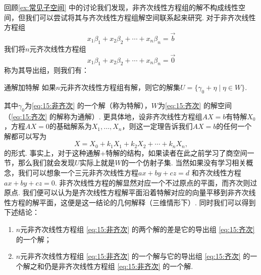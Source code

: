 回顾\autoref{ex:常见子空间} 中的讨论我们发现，非齐次线性方程组的解不构成线性空间，但我们可以尝试将其与齐次线性方程组解空间联系起来研究. 对于非齐次线性方程组
\begin{equation} \label{eq:15:非齐次}
    x_1\beta_1+x_2\beta_2+\cdots+x_n\beta_n=\vec{b}
\end{equation}
我们将$n$元齐次线性方程组
\begin{equation} \label{eq:15:齐次}
    x_1\beta_1+x_2\beta_2+\cdots+x_n\beta_n=\vec{0}
\end{equation}
称为其导出组，则我们有：
\begin{theorem}{}{通解加特解}
    如果$n$元非齐次线性方程组有解，则它的解集$U=\{\gamma_0+\eta \mid \eta \in W\}$.
\end{theorem}
其中$\gamma_0$为\autoref{eq:15:非齐次} 的一个解（称为特解），$W$为\autoref{eq:15:齐次} 的解空间（\autoref*{eq:15:齐次} 的解称为通解）. 更具体地，设非齐次线性方程组$AX=b$有特解$X_0$，方程$AX=0$的基础解系为$X_1,\ldots,X_n$，则这一定理告诉我们$AX=b$的任何一个解都可以写为
\[X=X_0+k_1X_1+k_2X_2+\cdots+k_nX_n,\]
的形式. 事实上，对于这种通解+特解的结构，如果读者在此之前学习了商空间一节，那么我们就会发现$U$实际上就是$W$的一个仿射子集. 当然如果没有学习相关概念，我们可以想象一个三元非齐次线性方程$ax + by + cz = d$ 和齐次线性方程$ax + by + cz = 0$. 非齐次线性方程的解显然对应一个不过原点的平面，而齐次则过原点. 我们便可以认为是齐次线性方程解平面沿着特解对应的向量平移到非齐次线性方程的解平面，这便是这一结论的几何解释（三维情形下）. 同时我们可以得到下述结论：
\begin{enumerate}
    \item $n$元非齐次线性方程组 \ref*{eq:15:非齐次} 的两个解的差是它的导出组 \ref*{eq:15:齐次} 的一个解；

    \item $n$元非齐次线性方程组 \ref*{eq:15:非齐次} 的一个解与它的导出组 \ref*{eq:15:齐次} 的一个解之和仍是非齐次线性方程组 \ref*{eq:15:非齐次} 的一个解.
\end{enumerate}

